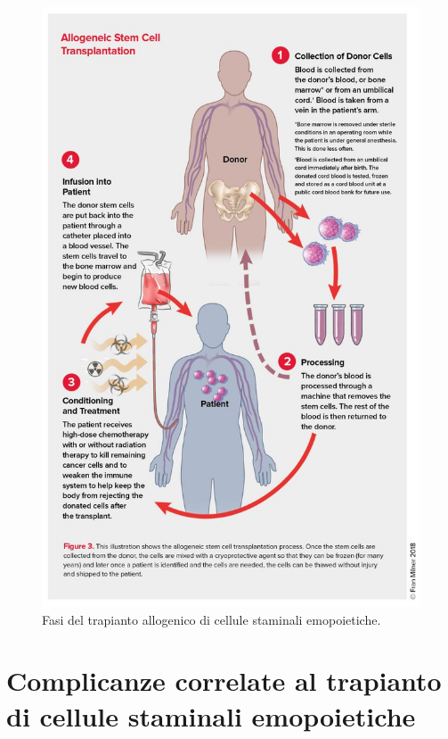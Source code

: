 \begin{figure}[H]
    \begin{center}
    \includegraphics[width=0.8\columnwidth]{img/ALLOGENICO.jpg}
    \vspace{-3mm}
    \end{center}
    \caption{Fasi del trapianto allogenico di cellule staminali emopoietiche.
    \cite{LLSBLOOD}}
    \label{fig:FIGURE_3.16}
\end{figure}

\section{Complicanze correlate al trapianto di cellule staminali emopoietiche}

